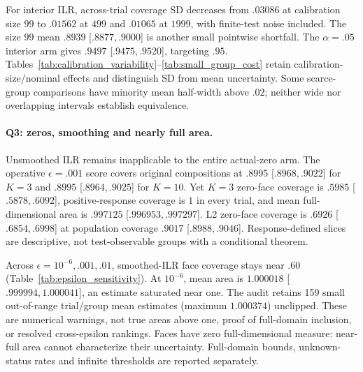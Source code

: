For interior ILR, across-trial coverage SD decreases from $.03086$ at calibration size $99$ to $.01562$ at $499$ and $.01065$ at $1999$, with finite-test noise included. The size $99$ mean $.8939$ [$ .8877,.9000$] is another small pointwise shortfall. The $\alpha=.05$ interior arm gives $.9497$ [$ .9475,.9520$], targeting $.95$. Tables~\ref{tab:calibration_variability}--\ref{tab:small_group_cost} retain calibration-size/nominal effects and distinguish SD from mean uncertainty. Some scarce-group comparisons have minority mean half-width above $.02$; neither wide nor overlapping intervals establish equivalence.

\paragraph{Q3: zeros, smoothing and nearly full area.}
Unsmoothed ILR remains inapplicable to the entire actual-zero arm. The operative $\epsilon=.001$ score covers original compositions at $.8995$ [$ .8968,.9022$] for $K=3$ and $.8995$ [$ .8964,.9025$] for $K=10$. Yet $K=3$ zero-face coverage is $.5985$ [$ .5878,.6092$], positive-response coverage is $1$ in every trial, and mean full-dimensional area is $.997125$ [$ .996953,.997297$]. L2 zero-face coverage is $.6926$ [$ .6854,.6998$] at population coverage $.9017$ [$ .8988,.9046$]. Response-defined slices are descriptive, not test-observable groups with a conditional theorem.

Across $\epsilon=10^{-6},.001,.01$, smoothed-ILR face coverage stays near $.60$ (Table~\ref{tab:epsilon_sensitivity}). At $10^{-6}$, mean area is $1.000018$ [$ .999994,1.000041$], an estimate saturated near one. The audit retains 159 small out-of-range trial/group mean estimates (maximum $1.000374$) unclipped. These are numerical warnings, not true areas above one, proof of full-domain inclusion, or resolved cross-epsilon rankings. Faces have zero full-dimensional measure: near-full area cannot characterize their uncertainty. Full-domain bounds, unknown-status rates and infinite thresholds are reported separately.
